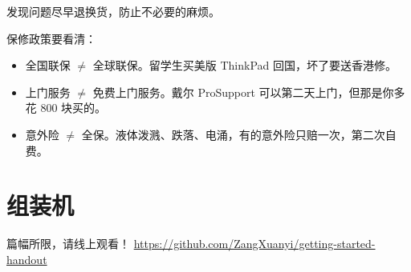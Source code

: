 \documentclass[../main.tex]{subfiles}
\begin{document}
发现问题尽早退换货，防止不必要的麻烦。

保修政策要看清：
\begin{itemize}
  \item 全国联保 $\neq$ 全球联保。留学生买美版 ThinkPad 回国，坏了要送香港修。
  \item 上门服务 $\neq$ 免费上门服务。戴尔 ProSupport 可以第二天上门，但那是你多花 800 块买的。
  \item 意外险 $\neq$ 全保。液体泼溅、跌落、电涌，有的意外险只赔一次，第二次自费。
\end{itemize}

\section{组装机}

\begin{tcolorbox}
  篇幅所限，请线上观看！
  \faGithub\href{https://github.com/ZangXuanyi/getting-started-handout}{https://github.com/ZangXuanyi/getting-started-handout}
\end{tcolorbox}






\end{document}
